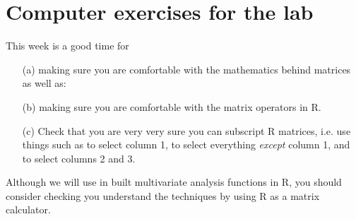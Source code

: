 

\section{Computer exercises for the lab}

This week is a good time for
\begin{itemize}
\item[(a)] making sure you are comfortable with the mathematics behind matrices as well as:
\item[(b)] making sure you are comfortable with the matrix operators in R.   
\item[(c)]  Check that you are very very sure you can subscript R matrices, i.e. use things such as \text{[,1]} to select column 1, \text{[,-1]} to select everything \emph{except} column 1, and \text{[,2:3]} to select columns 2 and 3.
\end{itemize}

Although we will use in built multivariate analysis functions in R, you should consider checking you understand the techniques by using R as a matrix calculator.
  
